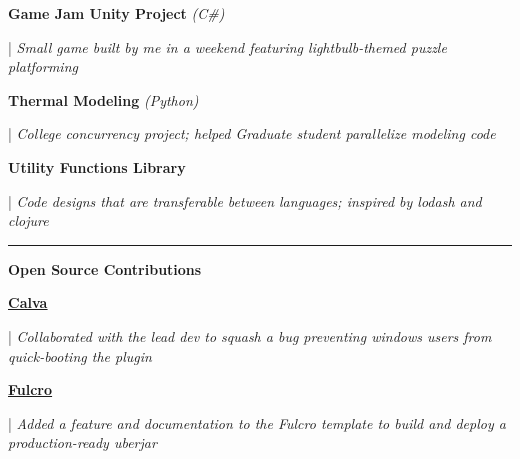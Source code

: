 \documentclass[letterpaper,11pt]{article}
\begin{document}
\begin{minipage}[t]{0.28\textwidth}
  \raggedright
  \textbf{ Game Jam Unity Project }\textit{(C\#)} \\
\end{minipage}
\hfill
\begin{minipage}[t]{0.70\textwidth}
  \raggedright
  |\textit{ Small game built by me in a weekend featuring lightbulb-themed puzzle platforming} \\
\end{minipage}

\begin{minipage}[t]{0.28\textwidth}
  \raggedright
  \textbf{ Thermal Modeling }\textit{(Python)}\\
\end{minipage}
\hfill
\begin{minipage}[t]{0.70\textwidth}
  \raggedright
  |\textit{ College concurrency project; helped Graduate student parallelize modeling code } \\
\end{minipage}

\begin{minipage}[t]{0.28\textwidth}
  \raggedright
  \textbf{ Utility Functions Library } \\
\end{minipage}
\hfill
\begin{minipage}[t]{0.70\textwidth}
  \raggedright
  |\textit{ Code designs that are transferable between languages; inspired by lodash and clojure } \\
\end{minipage}
\noindent\rule{19.5cm}{0.4pt}

\textbf{\large \textcolor{magic_blue}{Open Source Contributions}}

\begin{minipage}[t]{0.08\textwidth}
  \raggedright
  \href{https://github.com/BetterThanTomorrow/calva/issues/2325}{ \underline{\textbf{Calva}}} \\
\end{minipage}
\hfill
\begin{minipage}[t]{0.90\textwidth}
  \raggedright
  |\textit{ Collaborated with the lead dev to squash a bug preventing windows users from quick-booting the plugin } \\
\end{minipage}

\begin{minipage}[t]{0.08\textwidth}
  \raggedright
  \href{https://github.com/fulcrologic/fulcro-template/pull/28}{ \underline{\textbf{Fulcro}}} \\
\end{minipage}
\hfill
\begin{minipage}[t]{0.90\textwidth}
  \raggedright
  |\textit{ Added a feature and documentation to the Fulcro template to build and deploy a production-ready uberjar } \\
\end{minipage}
\end{document}
